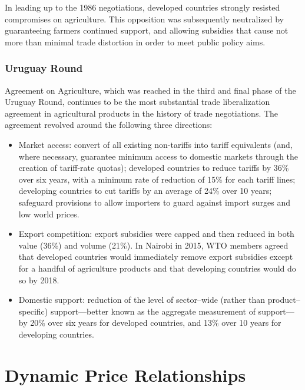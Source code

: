 \documentclass[
]{book}
\providecommand{\tightlist}{%
  \setlength{\itemsep}{0pt}\setlength{\parskip}{0pt}}
\begin{document}
In leading up to the 1986 negotiations, developed countries strongly resisted compromises on agriculture. This opposition was subsequently neutralized by guaranteeing farmers continued support, and allowing subsidies that cause not more than minimal trade distortion in order to meet public policy aims.

\hypertarget{uruguay-round}{%
\subsection{Uruguay Round}\label{uruguay-round}}

Agreement on Agriculture, which was reached in the third and final phase of the Uruguay Round, continues to be the most substantial trade liberalization agreement in agricultural products in the history of trade negotiations. The agreement revolved around the following three directions:

\begin{itemize}
\tightlist
\item
  Market access: convert of all existing non-tariffs into tariff equivalents (and, where necessary, guarantee minimum access to domestic markets through the creation of tariff-rate quotas); developed countries to reduce tariffs by 36\% over six years, with a minimum rate of reduction of 15\% for each tariff lines; developing countries to cut tariffs by an average of 24\% over 10 years; safeguard provisions to allow importers to guard against import surges and low world prices.
\item
  Export competition: export subsidies were capped and then reduced in both value (36\%) and volume (21\%). In Nairobi in 2015, WTO members agreed that developed countries would immediately remove export subsidies except for a handful of agriculture products and that developing countries would do so by 2018.
\item
  Domestic support: reduction of the level of sector--wide (rather than product--specific) support---better known as the aggregate measurement of support---by 20\% over six years for developed countries, and 13\% over 10 years for developing countries.
\end{itemize}

\hypertarget{dynamic-price-relationships}{%
\chapter{Dynamic Price Relationships}\label{dynamic-price-relationships}}
\end{document}
